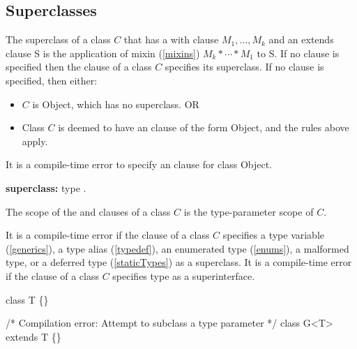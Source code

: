 \documentclass{article}
\newcommand{\code}[1]{{\sf #1}}
\begin{document}
\subsection{Superclasses}

\LMHash{}
The superclass of a class $C$ that has a with clause \code{\WITH{} $M_1, \ldots, M_k$} and an extends clause \code{\EXTENDS{} S} is the application of mixin (\ref{mixins}) $M_k* \cdots * M_1$  to S.  If no \WITH{} clause is specified then  the \EXTENDS{} clause of a class $C$ specifies its superclass. If no \EXTENDS{} clause is specified, then either:
\begin{itemize}
\item $C$ is \code{Object}, which has no superclass. OR
\item Class $C$ is  deemed to have an \EXTENDS{} clause of the form \code{\EXTENDS{} Object}, and the rules above apply.
\end{itemize}

\LMHash{}
It is a compile-time error to specify an \EXTENDS{} clause for class \code{Object}.

\begin{grammar}
{\bf superclass:}
      \EXTENDS{} type
    .
\end{grammar}


\LMHash{}
The scope of the \EXTENDS{} and \WITH{} clauses of a class $C$ is the type-parameter scope of $C$.

\LMHash{}
It is a compile-time error if the \EXTENDS{} clause of a class $C$ specifies a type variable (\ref{generics}), a type alias (\ref{typedef}), an enumerated type (\ref{enums}), a malformed type, or a deferred type (\ref{staticTypes}) as a superclass.
It is a compile-time error if the \EXTENDS{} clause of a class $C$ specifies type \DYNAMIC{} as a superinterface.


\begin{dartCode}
class T \{\}

/* Compilation error: Attempt to subclass a type parameter */
class G<T> extends T \{\}

\end{dartCode}
\end{document}

